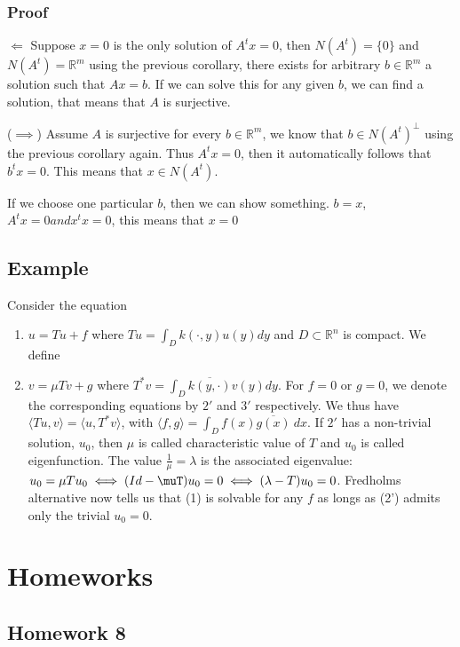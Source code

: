 \documentclass[11pt]{article}
\def\R{\mathbb{R}}
\begin{document}
\subsubsection{Proof}
\label{sec:org1db71e1}
\(\Leftarrow\) Suppose \(x = 0\) is the only solution of \(A^{t}x = 0\), then
\(N(A^{t}) = \{0\}\) and \(N(A^{t}) = \R^m\) using the previous corollary, there
exists for arbitrary \(b \in \R^m\) a solution such that \(Ax = b\). If we can
solve this for any given \(b\), we can find a solution, that means that \(A\) is
surjective.

(\(\implies\)) Assume \(A\) is surjective for every \(b \in \R^m\), we know that
\(b \in N(A^{t})^\perp\) using the previous corollary again. Thus \(A^{t}x =
    0\), then it automatically follows that \(b^{t}x = 0\). This means that \(x\in
    N(A^{t})\).

If we choose one particular \(b\), then we can show something. \(b = x\),
\(A^{t}x = 0 and x^{t}x = 0\), this means that \(x = 0\)
\subsection{Example}
\label{sec:org381c0a9}
Consider the equation 
\begin{enumerate}
\item \(u = Tu + f\) where \(Tu = \int_D k(\cdot, y) u(y) dy\) and \(D \subset \R^n\)
is compact. We define
\item \(v = \mu T v + g\) where \(T^{*}v = \int_D \overline{k(y,\cdot)} v(y) dy\).
For \(f = 0\) or \(g = 0\), we denote the corresponding equations by \(2'\) and
\(3'\) respectively. We thus have \(\langle Tu, v\rangle = \langle u,
      T^{*}v\rangle\), with \(\langle f, g \rangle = \int_D f(x) \overline{g(x)}\
      dx\). If \(2'\) has a non-trivial solution, \(u_0\), then \(\mu\) is called
characteristic value of \(T\) and \(u_0\) is called eigenfunction. The value
\(\frac{1}{\mu} =\lambda\) is the associated eigenvalue: \(u_0 = \mu T u_0
      \iff (Id - \muT) u_0 = 0 \iff (\lambda - T)u_0 = 0\). Fredholms alternative
now tells us that (1) is solvable for any \(f\) as longs as (2') admits only
the trivial \(u_0 = 0\).
\end{enumerate}
\section{Homeworks}
\label{sec:org88163cf}
\subsection{Homework 8}
\label{sec:org390fd21}
\end{document}
